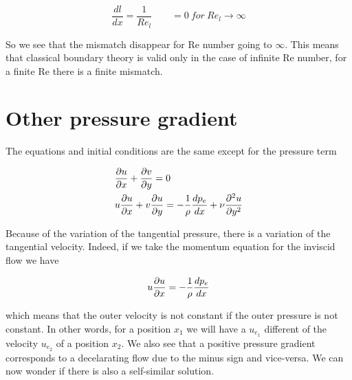 			\begin{equation}
				\frac{dl}{dx} = \frac{1}{Re_l}\qquad =0 \ for \ Re_l \rightarrow \infty
			\end{equation}
			
			So we see that the mismatch disappear for Re number going to $\infty$. This means that classical boundary theory is valid only in the case of infinite Re number, for a finite Re there is a finite mismatch. 
			
			
\section{Other pressure gradient}
	The equations and initial conditions are the same except for the pressure term
	
	\begin{equation}
		\begin{aligned}
		&\frac{\D u}{\D x} + \frac{\D v}{\D y} = 0\\
		&u \frac{\D u}{\D x} + v \frac{\D u}{\D y} =- \frac{1}{\rho} \frac{dp_e}{dx}+ \nu \frac{\D ^2 u}{\D y^2}
	\end{aligned}	
	\label{eq:5.44}
	\end{equation}
	
	Because of the variation of the tangential pressure, there is a variation of the tangential velocity. Indeed, if we take the momentum equation for the inviscid flow we have 
	
	\begin{equation}
		u \frac{\D u}{\D x} =- \frac{1}{\rho} \frac{dp_e}{dx}
	\end{equation}
	
	which means that the outer velocity is not constant if the outer pressure is not constant. In other words, for a position $x_1$ we will have a $u_{e_1}$ different of the velocity $u_{e_2}$ of a position $x_2$. We also see that a positive pressure gradient corresponds to a decelarating flow due to the minus sign and vice-versa. We can now wonder if there is also a self-similar solution. 
	
